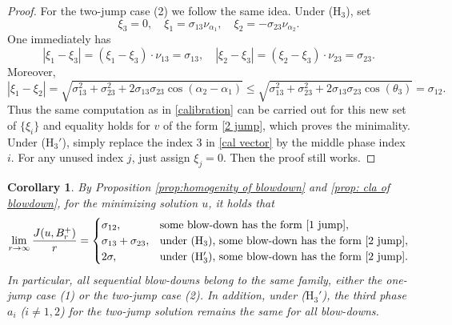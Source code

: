 \documentclass[leqno,11pt]{amsart}
\let\al=\alpha
\let\f=\frac
\newtheorem{corol}[theorem]{Corollary}
\theoremstyle{remark}
\begin{document}
\begin{proof}
For the two-jump case (2) we follow the same idea. Under ($\mathrm{H}_3$), set 
\begin{equation}\label{cal vector}
    \xi_3=0,\quad \xi_1=\sigma_{13}\nu_{\al_1},\quad \xi_2=-\sigma_{23} \nu_{\al_2}. 
\end{equation}
One immediately has 
\[
|\xi_1-\xi_3|= (\xi_1-\xi_3)\cdot \nu_{13}=\sigma_{13},\quad |\xi_2-\xi_3|= (\xi_2-\xi_3)\cdot\nu_{23}= \sigma_{23}.
\]
Moreover, 
\[
|\xi_1-\xi_2|=\sqrt{\sigma_{13}^2+\sigma_{23}^2+2\sigma_{13}\sigma_{23}\cos(\al_2-\al_1)}\leq \sqrt{\sigma_{13}^2+\sigma_{23}^2+2\sigma_{13}\sigma_{23}\cos(\theta_3)}=\sigma_{12}.
\]
Thus the same computation as in \eqref{calibration} can be carried out for this new set of $\{\xi_i\}$ and equality holds for $v$ of the form \eqref{2 jump}, which proves the minimality. Under ($\mathrm{H}_3'$), simply replace the index $3$ in \eqref{cal vector} by the middle phase index $i$. For any unused index $j$, just assign $\xi_j=0$. Then the proof still works. 

\end{proof}

\begin{corol}\label{corol:limit density}
    By Proposition \ref{prop:homogenity of blowdown} and \ref{prop: cla of blowdown}, for the minimizing solution $u$, it holds that 
    \begin{equation*}
        \lim_{r\to\infty} \f{J(u,B_r^+)}{r}=\begin{cases}
            \sigma_{12},&  \text{some blow-down has the form \eqref{1 jump}},\\
            \sigma_{13}+\sigma_{23}, & \text{under ($\mathrm{H}_3$), some blow-down has the form \eqref{2 jump}},\\
            2\sigma, & \text{under ($\mathrm{H}_3'$), some blow-down has the form \eqref{2 jump}}.
        \end{cases}
    \end{equation*}
    In particular, all sequential blow-downs belong to the same family, either the one-jump case (1) or the two-jump case (2). In addition, under ($\mathrm{H}_3'$), the third phase $a_i$ ($i\neq 1,2$) for the two-jump solution remains the same for all blow-downs.  
\end{corol}
\end{document}
